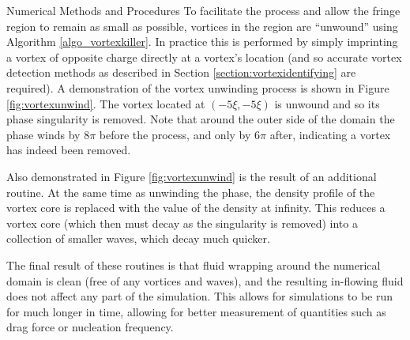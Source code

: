\begin{chapter}{\label{cha:numerics}Numerical Methods and Procedures}
To facilitate the process and allow the fringe region to remain as small as possible, vortices in the region are ``unwound'' using Algorithm \ref{algo_vortexkiller}. In practice this is performed by simply imprinting a vortex of opposite charge directly at a vortex's location (and so accurate vortex detection methods as described in Section \ref{section:vortexidentifying} are required). A demonstration of the vortex unwinding process is shown in Figure \ref{fig:vortexunwind}. The vortex located at $(-5\xi,-5\xi)$ is unwound and so its phase singularity is removed. Note that around the outer side of the domain the phase winds by $8\pi$ before the process, and only by $6\pi$ after, indicating a vortex has indeed been removed.

Also demonstrated in Figure \ref{fig:vortexunwind} is the result of an additional routine. At the same time as unwinding the phase, the density profile of the vortex core is replaced with the value of the density at infinity. This reduces a vortex core (which then must decay as the singularity is removed) into a collection of smaller waves, which decay much quicker.

The final result of these routines is that fluid wrapping around the numerical domain is clean (free of any vortices and waves), and the resulting in-flowing fluid does not affect any part of the simulation. This allows for simulations to be run for much longer in time, allowing for better measurement of quantities such as drag force or nucleation frequency.


\end{chapter}
